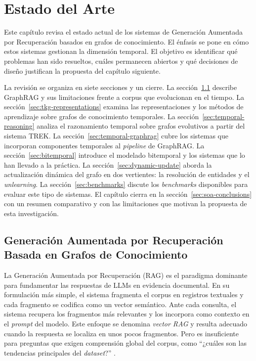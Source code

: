\chapter{Estado del Arte}\label{chapter:state-of-the-art}

Este capítulo revisa el estado actual de los sistemas de Generación Aumentada por Recuperación basados en grafos de conocimiento. El énfasis se pone en cómo estos sistemas gestionan la dimensión temporal. El objetivo es identificar qué problemas han sido resueltos, cuáles permanecen abiertos y qué decisiones de diseño justifican la propuesta del capítulo siguiente.

La revisión se organiza en siete secciones y un cierre. La sección~\ref{sec:graphrag-foundations} describe GraphRAG y sus limitaciones frente a corpus que evolucionan en el tiempo. La sección~\ref{sec:tkg-representations} examina las representaciones y los métodos de aprendizaje sobre grafos de conocimiento temporales. La sección~\ref{sec:temporal-reasoning} analiza el razonamiento temporal sobre grafos evolutivos a partir del sistema TREK. La sección~\ref{sec:temporal-graphrag} cubre los sistemas que incorporan componentes temporales al \emph{pipeline} de GraphRAG. La sección~\ref{sec:bitemporal} introduce el modelado bitemporal y los sistemas que lo han llevado a la práctica. La sección~\ref{sec:dynamic-update} aborda la actualización dinámica del grafo en dos vertientes: la resolución de entidades y el \emph{unlearning}. La sección~\ref{sec:benchmarks} discute los \emph{benchmarks} disponibles para evaluar este tipo de sistemas. El capítulo cierra en la sección~\ref{sec:soa-conclusions} con un resumen comparativo y con las limitaciones que motivan la propuesta de esta investigación.

\section{Generación Aumentada por Recuperación Basada en Grafos de Conocimiento}\label{sec:graphrag-foundations}

La Generación Aumentada por Recuperación (RAG) \cite{lewis2020rag} es el paradigma dominante para fundamentar las respuestas de LLMs en evidencia documental. En su formulación más simple, el sistema fragmenta el corpus en registros textuales y cada fragmento se codifica como un vector semántico. Ante cada consulta, el sistema recupera los fragmentos más relevantes y los incorpora como contexto en el \emph{prompt} del modelo. Este enfoque se denomina \emph{vector RAG} y resulta adecuado cuando la respuesta se localiza en unos pocos fragmentos. Pero es insuficiente para preguntas que exigen comprensión global del corpus, como ``¿cuáles son las tendencias principales del \emph{dataset}?'' \cite{edge2024local}.

